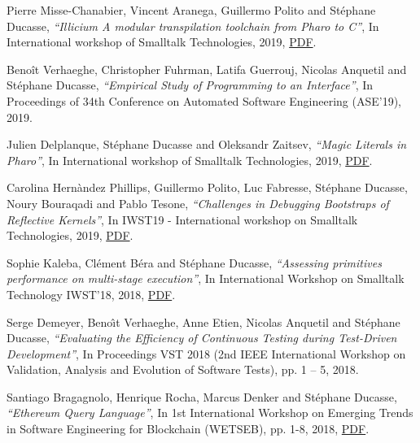 \documentclass{article}
\newcommand{\czauthors}[1]{#1}
\newcommand{\cztitle}[1]{\emph{``#1''}}
\newcommand{\czbooktitle}[1]{#1}
\begin{document}
\begin{itemize}

	\pub  \czauthors{Pierre Misse-Chanabier, Vincent Aranega, Guillermo Polito and St\'ephane Ducasse},  \cztitle{Illicium A modular transpilation toolchain from Pharo to C},  In \czbooktitle{International workshop of Smalltalk Technologies}, 2019, \href{http://rmod-files.lille.inria.fr/Team/Texts/Papers/Miss19a-IWST-Transpilation.pdf}{PDF}.

	\pub  \czauthors{Beno{\^i}t Verhaeghe, Christopher Fuhrman, Latifa Guerrouj, Nicolas Anquetil and St{\'e}phane Ducasse},  \cztitle{Empirical Study of Programming to an Interface},  In \czbooktitle{Proceedings of 34th Conference on Automated Software Engineering (ASE'19)}, 2019.

	\pub  \czauthors{Julien Delplanque, St\'ephane Ducasse and Oleksandr Zaitsev},  \cztitle{Magic Literals in Pharo},  In \czbooktitle{International workshop of Smalltalk Technologies}, 2019, \href{http://rmod-files.lille.inria.fr/Team/Texts/Papers/Delp19b-IWST-MagicLiterals.pdf}{PDF}.

	\pub  \czauthors{Carolina Hern\`andez Phillips, Guillermo Polito, Luc Fabresse, St\'ephane Ducasse, Noury Bouraqadi and Pablo Tesone},  \cztitle{Challenges in Debugging Bootstraps of Reflective Kernels},  In \czbooktitle{{IWST19 - International workshop on Smalltalk Technologies}}, 2019, \href{https://hal.archives-ouvertes.fr/hal-02297710/file/challengesInBootstrappingReflectiveKernels-corrected.pdf}{PDF}.

	\pub  \czauthors{Sophie Kaleba, Cl\'ement B\'era and St\'ephane Ducasse},  \cztitle{Assessing primitives performance on multi-stage execution},  In \czbooktitle{International Workshop on Smalltalk Technology {IWST'18}}, 2018, \href{http://rmod-files.lille.inria.fr/Team/Texts/Papers/Kabe18a-VMStringOptimisation.pdf}{PDF}.

	\pub  \czauthors{Serge Demeyer, Beno{\^\i}t Verhaeghe, Anne Etien, Nicolas Anquetil and St\'ephane Ducasse},  \cztitle{Evaluating the Efficiency of Continuous Testing during Test-Driven Development},  In \czbooktitle{Proceedings {VST 2018} (2nd IEEE International Workshop on Validation, Analysis and Evolution of Software Tests)}, pp. 1 -- 5, 2018.

	\pub  \czauthors{Santiago Bragagnolo, Henrique Rocha, Marcus Denker and St\'ephane Ducasse},  \cztitle{Ethereum Query Language},  In \czbooktitle{1st International Workshop on Emerging Trends in Software Engineering for Blockchain (WETSEB)}, pp. 1-8, 2018, \href{http://rmod-files.lille.inria.fr/Team/Texts/Papers/Braga18b-WETSEB-Query.pdf}{PDF}.


\end{itemize}
\end{document}
